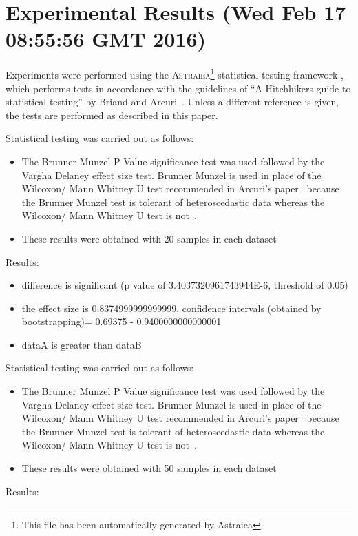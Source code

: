 \documentclass[]{article}
\begin{document}
\section{Experimental Results (Wed Feb 17 08:55:56 GMT 2016)}
Experiments were performed using the \textsc{Astraiea}\footnote{This file has been automatically generated by Astraiea} statistical testing framework \cite{Neumann:2014:EET:2598394.2609850},
which performs tests in accordance with the guidelines of ``A Hitchhikers guide to statistical testing''
by Briand and Arcuri~\cite{Arcuri2012}.
Unless a different reference is given, the tests are performed as described in this paper.

Statistical testing was carried out as follows: \begin{itemize}
\item{The Brunner Munzel P Value significance test was used followed by the Vargha Delaney effect size test. Brunner Munzel is used in place of the  Wilcoxon/ Mann Whitney U test recommended in Arcuri's paper~\cite{Arcuri2012} because the Brunner Munzel test is tolerant of heteroscedastic data whereas the Wilcoxon/ Mann Whitney U test is not~\cite{Brunner2000}.}
\item{These results were obtained with 20 samples in each dataset}
\end{itemize}Results:
\begin{itemize}
\item{difference is significant (p value of 3.4037320961743944E-6, threshold of 0.05)}
\item{the effect size is 0.8374999999999999, confidence intervals (obtained by bootstrapping)= 0.69375 - 0.9400000000000001}
\item{dataA is greater than dataB}
\end{itemize}Statistical testing was carried out as follows: \begin{itemize}
\item{The Brunner Munzel P Value significance test was used followed by the Vargha Delaney effect size test. Brunner Munzel is used in place of the  Wilcoxon/ Mann Whitney U test recommended in Arcuri's paper~\cite{Arcuri2012} because the Brunner Munzel test is tolerant of heteroscedastic data whereas the Wilcoxon/ Mann Whitney U test is not~\cite{Brunner2000}.}
\item{These results were obtained with 50 samples in each dataset}
\end{itemize}Results:
\end{document}
